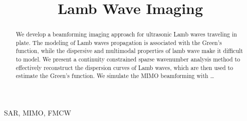 \documentclass{article}
\title{Lamb Wave Imaging}
\begin{document}
\maketitle
\begin{abstract}
We develop a beamforming imaging approach for ultrasonic Lamb waves traveling in plate. The modeling of Lamb waves propagation is associated with the Green's function, while the dispersive and multimodal properties of lamb wave make it difficult to model. We present a continuity constrained sparse wavenumber analysis method to effectively reconstruct the dispersion curves of Lamb waves, which are then used to estimate the Green's function. We simulate the MIMO beamforming with \ldots
\end{abstract}

\begin{keywords}
SAR, MIMO, FMCW
\end{keywords}

\end{document}
